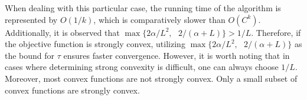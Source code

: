 When dealing with this particular case, the running time of the algorithm is represented by $O(1/k)$, which is comparatively slower than $O(C^{k})$. Additionally, it is observed that $\max\{2\alpha / L^{2},\text{ } 2/(\alpha+L)\} > 1/L.$ Therefore, if the objective function is strongly convex, utilizing $\max\{2\alpha / L^{2},\text{ } 2/(\alpha+L)\}$ as the bound for $\tau$ ensures faster convergence. However, it is worth noting that in cases where determining strong convexity is difficult, one can always choose $1/L$. Moreover, most convex functions are not strongly convex. Only a small subset of convex functions are strongly convex.
